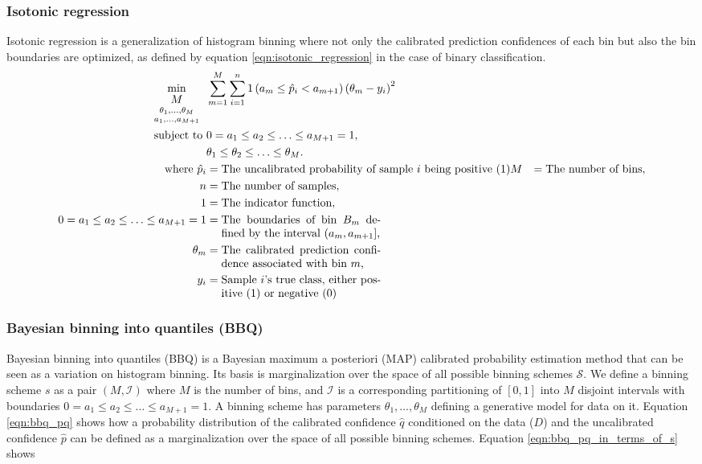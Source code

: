 \subsubsection{Isotonic regression}
Isotonic regression is a generalization of histogram binning where not only the calibrated prediction confidences of each bin but also the bin boundaries are optimized, as defined by equation \ref{eqn:isotonic_regression} in the case of binary classification.
\begin{align}
  \label{eqn:isotonic_regression}
  \min _{
    \begin{array}{c}
      M \\
	  \genfrac{}{}{0pt}{}{\theta_{1}, \ldots, \theta_{M}}{a_{1}, \ldots, a_{M+1}}
    \end{array}
  } & \sum_{m = 1}^{M} \sum_{i = 1}^{n} 1\left(a_{m} \leq \hat{p}_{i} < a_{m + 1}\right)\left(\theta_{m} - y_{i}\right)^{2} \\ \nonumber
  \text{ subject to } & 0 = a_{1} \leq a_{2} \leq \ldots \leq a_{M + 1}=1, \\
  & \theta_{1} \leq \theta_{2} \leq \ldots \leq \theta_{M}. \\ \nonumber
  \text{where}~\hat{p}_{i} &= \text{The uncalibrated probability of sample $i$ being positive (1)}
  M &= \text{The number of bins}, \\ \nonumber
  n &= \text{The number of samples}, \\ \nonumber
  1 &= \text{The indicator function}, \\ \nonumber
  0=a_{1} \leq a_{2} \leq \ldots \leq a_{M+1}=1 &= \parbox[t]{5cm}{The boundaries of bin $B_{m}$ defined by the interval $\left(a_{m}, a_{m+1}\right]$,} \\ \nonumber
  \theta_{m} &= \parbox[t]{5cm}{The calibrated prediction confidence associated with bin $m$,} \\ \nonumber
  y_{i} &= \parbox[t]{5cm}{Sample $i$'s true class, either positive (1) or negative (0)}
\end{align}

\subsubsection{Bayesian binning into quantiles (BBQ)}
Bayesian binning into quantiles (BBQ) is a Bayesian maximum a posteriori (MAP) calibrated probability estimation method that can be seen as a variation on histogram binning. Its basis is marginalization over the space of all possible binning schemes $\mathcal{S}$. We define a binning scheme $s$ as a pair $(M, \mathcal{I})$ where $M$ is the number of bins, and $\mathcal{I}$ is a corresponding partitioning of $[0,1]$ into $M$ disjoint intervals with boundaries $0=a_{1} \leq a_{2} \leq \ldots \leq a_{M+1}=1$. A binning scheme has parameters $\theta_{1}, \ldots, \theta_{M}$ defining a generative model for data on it. Equation \ref{eqn:bbq_pq} shows how a probability distribution of the calibrated confidence $\hat{q}$ conditioned on the data ($D$) and the uncalibrated confidence $\hat{p}$ can be defined as a marginalization over the space of all possible binning schemes. Equation \ref{eqn:bbq_pq_in_terms_of_s} shows


